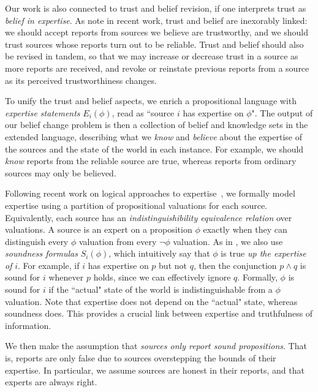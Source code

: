 Our work is also connected to trust and belief revision, if one interprets
trust as \emph{belief in expertise}. As \textcite{yasser_21} note in recent work,
trust and belief are inexorably linked: we should accept reports from sources
we believe are trustworthy, and we should trust sources whose reports turn out
to be reliable. Trust and belief should also be revised in tandem, so that we
may increase or decrease trust in a source as more reports are received,
and revoke or reinstate previous reports from a source as its perceived
trustworthiness changes.\footnotemark{}


To unify the trust and belief aspects, we enrich a propositional language with
\emph{expertise statements} $E_i(\phi)$, read as ``source $i$ has expertise on
$\phi$". The output of our belief change problem is then a collection of belief
and knowledge sets in the extended language, describing what we \emph{know} and
\emph{believe} about the expertise of the sources and the state of the world in
each instance. For example, we should \emph{know} reports from the reliable
source are true, whereas reports from ordinary sources may only be believed.

Following recent work on logical approaches to
expertise~\cite{singleton2021logic,booth_trust_2018}, we formally model
expertise using a partition of propositional valuations for each source.
Equivalently, each source has an \emph{indistinguishibility equivalence
relation} over valuations. A source is an expert on a proposition $\phi$
exactly when they can distinguish every $\phi$ valuation from every
$\neg\phi$ valuation.\footnotemark{} As in \textcite{singleton2021logic}, we also
use \emph{soundness formulas} $S_i(\phi)$, which intuitively say that $\phi$ is
true \emph{up the expertise of} $i$. For example, if $i$ has expertise on $p$
but not $q$, then the conjunction $p \land q$ is sound for $i$ whenever $p$
holds, since we can effectively ignore $q$. Formally,
$\phi$ is sound for $i$ if the ``actual" state of the world is
indistinguishable from a $\phi$ valuation. Note that expertise does not depend
on the ``actual" state, whereas soundness does. This provides a crucial link
between expertise and truthfulness of information.

We then make the assumption that \emph{sources only report sound propositions}.
That is, reports are only false due to sources overstepping the bounds of their
expertise. In particular, we assume sources are honest in their reports,
and that experts are always right.

